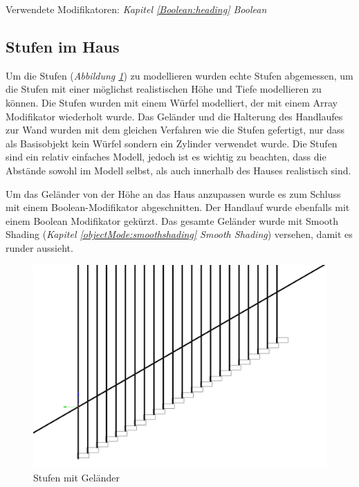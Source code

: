 Verwendete Modifikatoren: \textit{Kapitel \ref{Boolean:heading} \dq Boolean\dq}

\subsection{Stufen im Haus}
\label{Stufen_Im_Haus:Heading}
Um die Stufen (\textit{Abbildung \ref{Stufen_Im_Haus:Bild}}) zu modellieren wurden echte Stufen abgemessen, um die Stufen mit einer möglichst realistischen Höhe und Tiefe modellieren zu können.
Die Stufen wurden mit einem Würfel modelliert, der mit einem Array Modifikator wiederholt wurde. Das Geländer und die Halterung des Handlaufes zur Wand
wurden mit dem gleichen Verfahren wie die Stufen gefertigt, nur dass als Basisobjekt kein Würfel sondern ein Zylinder verwendet wurde.
Die Stufen sind ein relativ einfaches Modell, jedoch ist es wichtig zu beachten, dass die Abstände sowohl im Modell selbst, als auch innerhalb des Hauses realistisch sind.

Um das Geländer von der Höhe an das Haus anzupassen wurde es zum Schluss mit einem Boolean-Modifikator abgeschnitten.
Der Handlauf wurde ebenfalls mit einem Boolean Modifikator gekürzt. Das gesamte Geländer wurde mit Smooth Shading (\textit{Kapitel \ref{objectMode:smoothshading} \dq Smooth Shading\dq})
versehen, damit es runder aussieht.

\begin{figure}[H]
     \centering
     \includegraphics[width=.8\textwidth]{images/Stufen-Haus_Stufen.png}
     \caption{Stufen mit Geländer}
     \label{Stufen_Im_Haus:Bild}
\end{figure}

